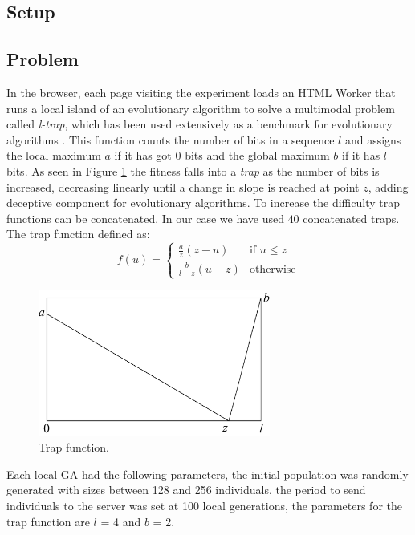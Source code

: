 \documentclass{llncs}
\begin{document}
\subsection{Setup}

\subsection{Problem}
In the browser, each page visiting the experiment loads an HTML Worker
that runs a local island of an evolutionary algorithm to solve a
multimodal problem called {\em l-trap}, which has been used extensively 
as a benchmark for evolutionary algorithms \cite{fernandes2009using,nijssen2003analysis}. 
This function counts the number of bits in a sequence $l$ and assigns
the local maximum $a$ if it has got 0 bits and the global maximum $b$ if it has $l$
bits. As seen in Figure \ref{fig:trap} the fitness falls into a {\em trap} 
as the number of bits is increased, decreasing linearly until a change in slope 
is reached at point $z$, adding deceptive component for evolutionary algorithms. 
To increase the difficulty trap functions can be concatenated.
In our case we have used $40$ concatenated traps. The trap function  defined as:   
\[ f(u)= 
    \begin{cases} 
      \frac{a}{z}(z-u) & \text{if } u\leq z\\
      \frac{b}{l-z} (u-z)& \text{otherwise} 
   \end{cases}
\]
\begin{figure}[t]
    \centering
        \includegraphics[width=3in]{img/trap.png}
    \caption{Trap function.
    }
    \label{fig:trap}
\end{figure}

Each local GA had the following parameters, the initial population was randomly generated 
with sizes between 128 and 256 individuals, the period to send individuals to the server
was set at 100 local generations, the parameters for the trap function are $l$ = 4 and $b$ = 2.
\end{document}
